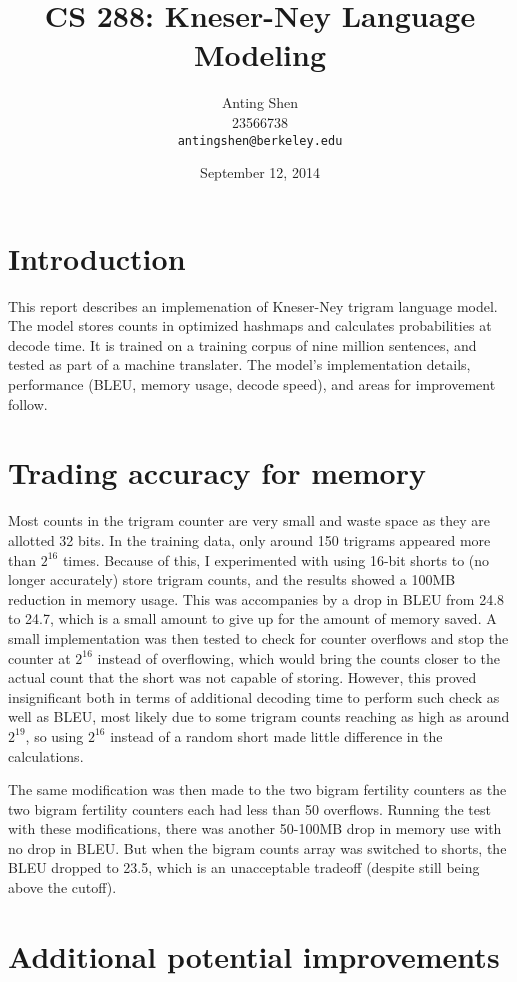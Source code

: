 \documentclass[11pt]{article}
\title{CS 288: Kneser-Ney Language Modeling}
\author{Anting Shen \\
  23566738 \\
  {\tt antingshen@berkeley.edu} \\
}
\date{September 12, 2014}
\begin{document}
\maketitle

\section{Introduction}

This report describes an implemenation of Kneser-Ney trigram language model. The model stores counts in optimized hashmaps and calculates probabilities at decode time. It is trained on a training corpus of nine million sentences, and tested as part of a machine translater. The model's implementation details, performance (BLEU, memory usage, decode speed), and areas for improvement follow.

\section{Trading accuracy for memory}

Most counts in the trigram counter are very small and waste space as they are allotted 32 bits. In the training data, only around 150 trigrams appeared more than $2^{16}$ times. Because of this, I experimented with using 16-bit shorts to (no longer accurately) store trigram counts, and the results showed a 100MB reduction in memory usage. This was accompanies by a drop in BLEU from 24.8 to 24.7, which is a small amount to give up for the amount of memory saved. A small implementation was then tested to check for counter overflows and stop the counter at $2^{16}$ instead of overflowing, which would bring the counts closer to the actual count that the short was not capable of storing. However, this proved insignificant both in terms of additional decoding time to perform such check as well as BLEU, most likely due to some trigram counts reaching as high as around $2^{19}$, so using $2^{16}$ instead of a random short made little difference in the calculations.

The same modification was then made to the two bigram fertility counters as the two bigram fertility counters each had less than 50 overflows. Running the test with these modifications, there was another 50-100MB drop in memory use with no drop in BLEU. But when the bigram counts array was switched to shorts, the BLEU dropped to 23.5, which is an unacceptable tradeoff (despite still being above the cutoff).

\section{Additional potential improvements}
\end{document}
